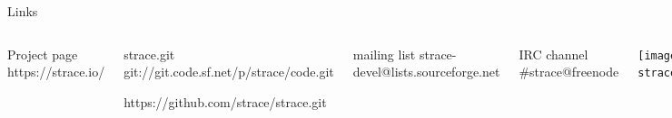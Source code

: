 \documentclass[unicode,aspectratio=169]{beamer}
\begin{document}
{
\begin{frame}{Links}
\begin{columns}
	\column{10cm}
		\begin{block}{Project page}
			https://strace.io/
		\end{block}
		\begin{block}{strace.git}
			git://git.code.sf.net/p/strace/code.git

			https://github.com/strace/strace.git
		\end{block}
		\begin{block}{mailing list}
			strace-devel@lists.sourceforge.net
		\end{block}
		\begin{block}{\large IRC channel}
			\#strace@freenode
		\end{block}
	\column{4cm}
		\centerline{\texttt{[image: strace.pdf]}}
\end{columns}
\end{frame}
}
\end{document}
